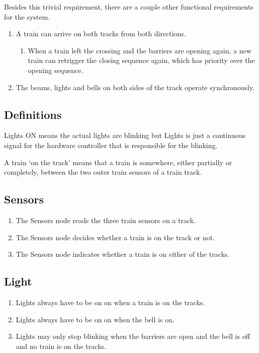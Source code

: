 \documentclass[final]{report}
\begin{document}
Besides this trivial requirement, there are a couple other functional requirements for the system.

\begin{enumerate}
\item A train can arrive on both tracks from both directions.
	\begin{enumerate}
	\item When a train left the crossing and the barriers are opening again, a new train can retrigger the closing sequence again, which has priority over the opening sequence.
	\end{enumerate}

\item The beams, lights and bells on both sides of the track operate synchronously.
\end{enumerate}

\subsection{Definitions}
Lights ON means the actual lights are blinking but Lights is just a continuous signal for the hardware controller that is responsible for the blinking.

A train `on the track' means that a train is somewhere, either partially or completely, between the two outer train sensors of a train track.

\subsection{Sensors}
	\begin{enumerate}
		\item The Sensors node reads the three train sensors on a track.
		\item The Sensors node decides whether a train is on the track or not.
		\item The Sensors node indicates whether a train is on either of the tracks.
	\end{enumerate}

\subsection{Light}
	\begin{enumerate}
		\item Lights always have to be on on when a train is on the tracks.
		\item Lights always have to be on on when the bell is on.
		\item Lights may only stop blinking when the barriers are open and the bell is off and no train is on the tracks.
	\end{enumerate}
\end{document}
